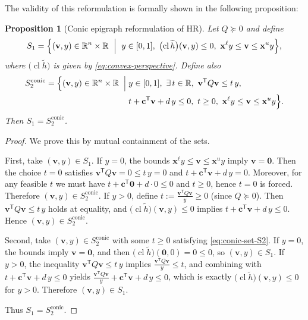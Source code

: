 \documentclass[11pt]{article}
\newtheorem{proposition}{Proposition}
\begin{document}
The validity of this reformulation is formally shown in the following proposition:
\begin{proposition}[Conic epigraph reformulation of HR]
\label{prop:conic-epi-equiv}
Let $Q\succeq 0$ and define
\begin{equation}
\label{eq:conic-set-S1}
S_{1}
=
\Bigl\{(\mathbf v,y)\in\mathbb R^{n}\times\mathbb R \ \Bigm|\ 
y\in[0,1],\ 
\bigl(\operatorname{cl}\widetilde h\bigr)(\mathbf v,y)\le 0,\ 
\mathbf x^{\ell}y\le \mathbf v\le \mathbf x^{u}y
\Bigr\},
\end{equation}
where $\bigl(\operatorname{cl}\widetilde h\bigr)$ is given by \eqref{eq:convex-perspective}. Define also
\begin{equation}
\label{eq:conic-set-S2}
\begin{aligned}
S_{2}^{\mathrm{conic}}
=
\Bigl\{(\mathbf v,y)\in\mathbb R^{n}\times\mathbb R \;\Bigm|\;&
y\in[0,1],\ \exists\, t\in\mathbb R,\ 
\mathbf v^{\mathsf T}Q\mathbf v \le t\,y,\\
& t + \mathbf c^{\mathsf T}\mathbf v + d\,y \le 0,\ 
t\ge 0,\ 
\mathbf x^{\ell}y\le \mathbf v\le \mathbf x^{u}y
\Bigr\}.
\end{aligned}
\end{equation}
Then $S_{1} = S_{2}^{\mathrm{conic}}$.
\end{proposition}

\begin{proof}
We prove this by mutual containment of the sets.

First, take $(\mathbf v,y)\in S_{1}$.
If $y=0$, the bounds $\mathbf x^{\ell}y\le \mathbf v\le \mathbf x^{u}y$ imply $\mathbf v=\mathbf 0$.
Then the choice $t=0$ satisfies $\mathbf v^{\mathsf T}Q\mathbf v = 0 \le t\,y=0$ and
$t+\mathbf c^{\mathsf T}\mathbf v + d\,y = 0$. Moreover, for any feasible $t$ we must have
$t+\mathbf c^{\mathsf T}\mathbf 0 + d\cdot 0 \le 0$ and $t\ge 0$, hence $t=0$ is forced.
Therefore $(\mathbf v,y)\in S_{2}^{\mathrm{conic}}$.
If $y>0$, define $t := \frac{\mathbf v^{\mathsf T}Q\mathbf v}{y}\ge 0$ (since $Q\succeq 0$).
Then $\mathbf v^{\mathsf T}Q\mathbf v \le t\,y$ holds at equality, and
$\bigl(\operatorname{cl}\widetilde h\bigr)(\mathbf v,y)\le 0$ implies
$t+\mathbf c^{\mathsf T}\mathbf v + d\,y \le 0$. Hence $(\mathbf v,y)\in S_{2}^{\mathrm{conic}}$.

Second, take $(\mathbf v,y)\in S_{2}^{\mathrm{conic}}$ with some $t\ge 0$ satisfying \eqref{eq:conic-set-S2}.
If $y=0$, the bounds imply $\mathbf v=\mathbf 0$, and then
$\bigl(\operatorname{cl}\widetilde h\bigr)(\mathbf 0,0)=0\le 0$, so $(\mathbf v,y)\in S_{1}$.
If $y>0$, the inequality $\mathbf v^{\mathsf T}Q\mathbf v \le t\,y$ implies
$\frac{\mathbf v^{\mathsf T}Q\mathbf v}{y}\le t$, and combining with
$t + \mathbf c^{\mathsf T}\mathbf v + d\,y \le 0$ yields
$\frac{\mathbf v^{\mathsf T}Q\mathbf v}{y} + \mathbf c^{\mathsf T}\mathbf v + d\,y \le 0$,
which is exactly $\bigl(\operatorname{cl}\widetilde h\bigr)(\mathbf v,y)\le 0$ for $y>0$.
Therefore $(\mathbf v,y)\in S_{1}$.

Thus $S_{1} = S_{2}^{\mathrm{conic}}$.
\end{proof}
\end{document}
